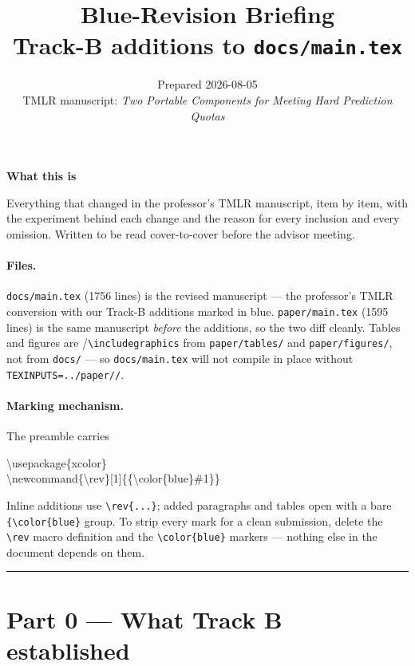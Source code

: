 \documentclass[11pt,a4paper]{article}
\title{\vspace{-1.5cm}\textbf{Blue-Revision Briefing}\\[2pt]
\large Track-B additions to \texttt{docs/main.tex}}
\author{}
\date{\small Prepared 2026-08-05\\[2pt]
TMLR manuscript: \emph{Two Portable Components for Meeting Hard Prediction Quotas}}
\newenvironment{callout}[1]
  {\par\medskip\noindent\begin{lrbox}{\calloutbox}%
   \begin{minipage}{\dimexpr\linewidth-20pt\relax}%
   \textbf{#1}\par\smallskip}
  {\end{minipage}\end{lrbox}%
   \setlength{\fboxsep}{10pt}%
   \colorbox{boxgrey}{\usebox{\calloutbox}}\par\medskip}
\begin{document}
\maketitle
\vspace{-1.2cm}

\begin{callout}{What this is}
Everything that changed in the professor's TMLR manuscript, item by item, with the experiment
behind each change and the reason for every inclusion and every omission. Written to be read
cover-to-cover before the advisor meeting.
\end{callout}

\paragraph{Files.} \texttt{docs/main.tex} (1756 lines) is the revised manuscript --- the professor's
TMLR conversion with our Track-B additions marked in blue. \texttt{paper/main.tex} (1595 lines) is
the same manuscript \emph{before} the additions, so the two diff cleanly. Tables and figures are
\verb||/\verb|\includegraphics| from \texttt{paper/tables/} and \texttt{paper/figures/}, not
from \texttt{docs/} --- so \texttt{docs/main.tex} will not compile in place without
\texttt{TEXINPUTS=../paper//}.

\paragraph{Marking mechanism.} The preamble carries

\vspace{-0.4em}
\begin{center}\ttfamily\small
\textbackslash usepackage\{xcolor\}\\
\textbackslash newcommand\{\textbackslash rev\}[1]\{\{\textbackslash color\{blue\}\#1\}\}
\end{center}
\vspace{-0.4em}

\noindent Inline additions use \verb|\rev{...}|; added paragraphs and tables open with a bare
\verb|{\color{blue}| group. To strip every mark for a clean submission, delete the \verb|\rev|
macro definition and the \verb|\color{blue}| markers --- nothing else in the document depends on
them.

\vspace{0.4em}
{\color{rulegrey}\hrule}

\section*{Part 0 --- What Track B established}
\end{document}

